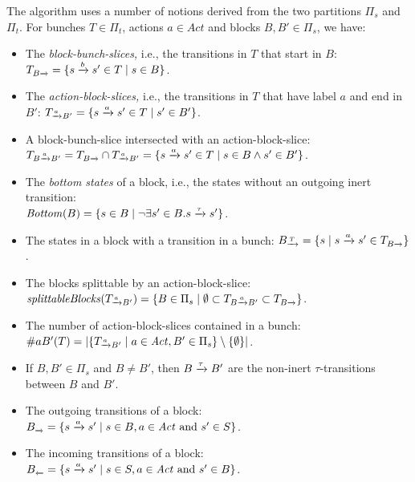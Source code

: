 \documentclass[a4paper,10pt]{article}
\theoremstyle{definition}
\theoremstyle{plain}
\newcommand{\pijl}[1]{\mathrel{\text{$\xrightarrow{\smash[t]{#1}}$}}}
\newcommand{\npijl}[1]{\mathrel{\text{$\centernot{\xrightarrow{\smash[t]{#1}}}$}}}
\newcommand{\lijp}[1]{\mathrel{\text{$\xleftarrow{\smash[t]{#1}}$}}}
\newcommand{\TB}{T_{B\pijl{}}}
\newcommand{\TBaB}{T_{B\pijl{a} B'}}
\newcommand{\TaB}{T_{\pijl{a} B'}}
\newcommand{\BT}{B_{\pijl{T}}}
\newcommand{\BnotT}{B_{\npijl{T}}}
\newcommand{\nraB}{\#aB'}
\newcommand{\Bottom}{\mathit{Bottom}}
\newcommand{\splittableBlocks}{\mathit{splittableBlocks}}
\begin{document}
The algorithm uses a number of notions derived from the two partitions $\Pi_s$ and $\Pi_t$.
For bunches $T\in \Pi_t$, actions $a \in \mathit{Act}$ and blocks $B, B' \in \Pi_s$, we have:
\begin{itemize}
\item	The \textit{block-bunch-slices,} i.e., the transitions in $T$ that start in $B$:
$
\TB = \{ s \pijl{b} s' \in T \mid s \in B \}
$.
\item	The \textit{action-block-slices,} i.e., the transitions in $T$ that have label $a$ and end in $B'$:
$
\TaB = \{ s \pijl{a} s' \in T \mid s' \in B' \}
$.
\item	A block-bunch-slice intersected with an action-block-slice:\\
\hspace*{1cm}$\TBaB = \TB \cap \TaB = \{ s \pijl{a} s' \in T \mid s \in B \wedge s' \in B' \}$.
\item	The \textit{bottom states} of a block, i.e., the states without an outgoing inert transition:\\
\hspace*{1cm}$
\Bottom(B) = \{ s \in B \mid \neg\exists s' \in B . s \pijl{\tau} s' \}
$.
\item	The states in a block with a transition in a bunch:
$
\BT = \{ s \mid s \pijl{a} s' \in \TB \}
$.
\item	The blocks splittable by an action-block-slice:\\
\hspace*{1cm}
$\splittableBlocks(\TaB) = \{ B \in \Pi_s \mid  \emptyset \subset \TBaB \subset \TB \}$.
\item	The number of action-block-slices contained in a bunch:\\
\hspace*{1cm}$\nraB(T) = \left| \{ \TaB \mid a \in \mathit{Act}, B' \in
\Pi_s \} \setminus \{ \emptyset \} \right|$.
\item	If $B, B' \in \Pi_s$ and $B \neq B'$, then $B \pijl{\tau} B'$ are the non-inert $\tau$-transitions between $B$ and $B'$.
\item	The outgoing transitions of a block:
$B_{\pijl{}}=\{ s\pijl{a}s'\mid s\in B, a\in\mathit{Act} \text{ and } s'\in S\}$.
\item	The incoming transitions of a block:
$B_{\lijp{}}=\{ s\pijl{a}s'\mid s\in S, a\in\mathit{Act} \text{ and } s'\in B\}$.
\end{itemize}
\end{document}
